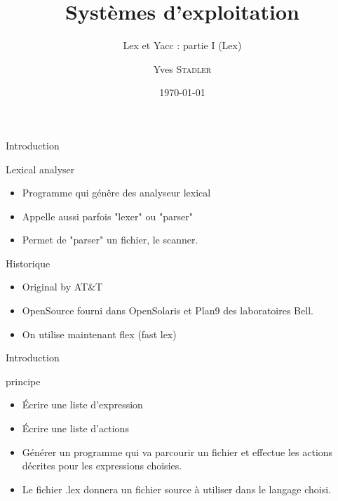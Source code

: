 
\title{Systèmes d'exploitation}
\subtitle{Lex et Yacc : partie I (Lex)}

\author{Yves \textsc{Stadler}}

\date{\today}




\begin{frame}
\titlepage
\end{frame}


\def\ftitle{Introduction}
\begin{frame}[containsverbatim]{\ftitle}
\def\blocktitle{Lexical analyser}
\begin{block}{\blocktitle}
\begin{itemize}
\item Programme qui génêre des analyseur lexical
\item Appelle aussi parfois "lexer" ou "parser"
\item Permet de "parser" un fichier, le scanner.
\end{itemize}
\end{block}
\def\blocktitle{Historique}
\begin{block}{\blocktitle}
\begin{itemize}
\item Original by AT\&T
\item OpenSource fourni dans OpenSolaris et Plan9 des laboratoires Bell.
\item On utilise maintenant flex (fast lex)
\end{itemize}
\end{block}
\end{frame}


\def\ftitle{Introduction}
\begin{frame}[containsverbatim]{\ftitle}
\def\blocktitle{principe}
\begin{block}{\blocktitle}
\begin{itemize}
\item Écrire une liste d'expression
\item Écrire une liste d'actions 
\item Générer un programme qui va parcourir un fichier et effectue les actions décrites pour les expressions choisies.
\item Le fichier .lex donnera un fichier source à utiliser dans le langage choisi.
\end{itemize}
\end{block}
\end{frame}

